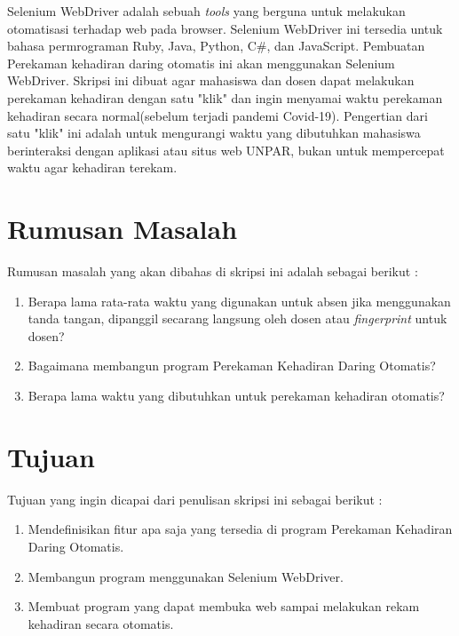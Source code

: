 \documentclass[a4paper,twoside]{article}
\begin{document}
 Selenium WebDriver adalah sebuah \textit{tools} yang berguna untuk melakukan otomatisasi terhadap web pada browser. Selenium WebDriver ini tersedia untuk bahasa permrograman Ruby, Java, Python, C\#, dan JavaScript. Pembuatan Perekaman kehadiran daring otomatis ini akan menggunakan Selenium WebDriver. Skripsi ini dibuat agar mahasiswa dan dosen dapat melakukan perekaman kehadiran dengan satu "klik" dan ingin menyamai waktu perekaman kehadiran secara normal(sebelum terjadi pandemi Covid-19). Pengertian dari satu "klik" ini adalah untuk mengurangi waktu yang dibutuhkan mahasiswa berinteraksi dengan aplikasi atau situs web UNPAR, bukan untuk mempercepat waktu agar kehadiran terekam. 

\section{Rumusan Masalah}
Rumusan masalah yang akan dibahas di skripsi ini adalah sebagai berikut :
\begin{enumerate}
	\item Berapa lama rata-rata waktu yang digunakan untuk absen jika menggunakan tanda tangan, dipanggil secarang langsung oleh dosen atau \textit{fingerprint} untuk dosen?
	\item Bagaimana membangun program Perekaman Kehadiran Daring Otomatis?
	\item Berapa lama waktu yang dibutuhkan untuk perekaman kehadiran otomatis?
	
\end{enumerate}

\section{Tujuan}
Tujuan yang ingin dicapai dari penulisan skripsi ini sebagai berikut :
\begin{enumerate}
	\item Mendefinisikan fitur apa saja yang tersedia di program Perekaman Kehadiran Daring Otomatis.
	\item Membangun program menggunakan Selenium WebDriver.
	\item Membuat program yang dapat membuka web sampai melakukan rekam kehadiran secara otomatis.
	
\end{enumerate}
\end{document}
